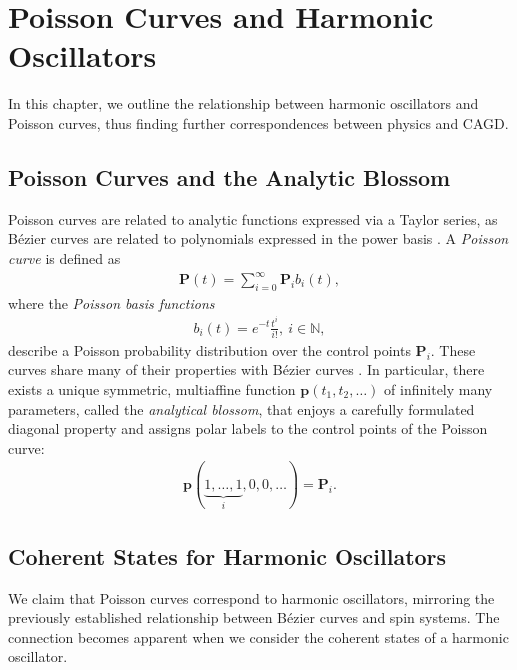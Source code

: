 \documentclass[final,3p,mathptmx]{elsarticle}
\begin{document}
\section{Poisson Curves  and Harmonic Oscillators}\label{sec:poisson_osc}
In this chapter, we outline the relationship between harmonic oscillators and Poisson curves, thus finding further correspondences between physics and CAGD.
\subsection{Poisson Curves and the Analytic Blossom}
Poisson curves are related to analytic functions expressed via a Taylor series, as B\'{e}zier curves are related to polynomials expressed in the power basis \cite{morin2000subdivision,morin2002analytic}. A \emph{Poisson curve} is defined as
\begin{align}
\mathbf{P}(t) = \sum_{i = 0}^{\infty}\mathbf{P}_{i}b_{i}(t),
\end{align} 
where the \emph{Poisson basis functions} 
\begin{align}\label{eq:poisson_basis}
b_{i}(t) = e^{-t}\frac{t^{i}}{i!},\ i \in \mathbb{N},
\end{align}
describe a Poisson probability distribution over the control points $\mathbf{P}_{i}$. These curves share many of their properties with B\'{e}zier curves \cite{morin2002analytic}. In particular, there exists a unique symmetric, multiaffine function $\mathbf{p}(t_{1}, t_{2}, \ldots)$ of infinitely many parameters, called the \emph{analytical blossom}, that enjoys a carefully formulated diagonal property \cite{morin2002analytic,goldman2002affine} and assigns polar labels to the control points of the Poisson curve:
\begin{align}
\mathbf{p}(\underbrace{1, \ldots, 1}_{i}, 0, 0,  \ldots) = \mathbf{P}_{i}.
\end{align}

\subsection{Coherent States for Harmonic Oscillators}
We claim that Poisson curves correspond to harmonic oscillators, mirroring the previously established relationship between B\'{e}zier curves and spin systems. The connection becomes apparent when we consider the coherent states of a harmonic oscillator. 
\end{document}
